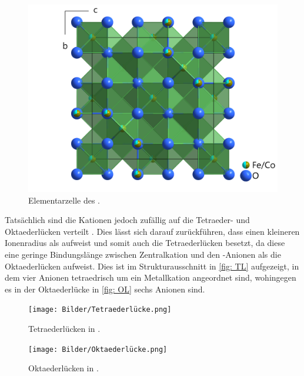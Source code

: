 \documentclass[a4paper,12pt,bibliography=totocnumbered]{scrartcl}
\begin{document}
\begin{figure}[H]
    \centering
    \includegraphics[scale=0.2]{Bilder/Elementarzelle.png}
    \caption{Elementarzelle des .\cite{Rieck}}
    \label{fig: Elementarzelle}
\end{figure}

Tatsächlich sind die Kationen jedoch zufällig auf die Tetraeder- und Oktaederlücken verteilt \cite{Rieck}.
Dies lässt sich darauf zurückführen, dass  einen kleineren Ionenradius als  aufweist und somit auch die Tetraederlücken besetzt, da diese eine geringe Bindungslänge zwischen Zentralkation und den -Anionen als die Oktaederlücken aufweist.
Dies ist im Strukturausschnitt in \autoref{fig: TL} aufgezeigt, in dem vier Anionen tetraedrisch um ein Metallkation angeordnet sind, wohingegen es in der Oktaederlücke in \autoref{fig: OL} sechs Anionen sind.


\begin{figure}[H]
    \centering
    \texttt{[image: Bilder/Tetraederlücke.png]}
    \caption{Tetraederlücken in .\cite{Rieck}}
    \label{fig: TL}
\end{figure}

\begin{figure}[H]
    \centering
    \texttt{[image: Bilder/Oktaederlücke.png]}
    \caption{Oktaederlücken in .\cite{Rieck}}
    \label{fig: OL}
\end{figure}
\end{document}
